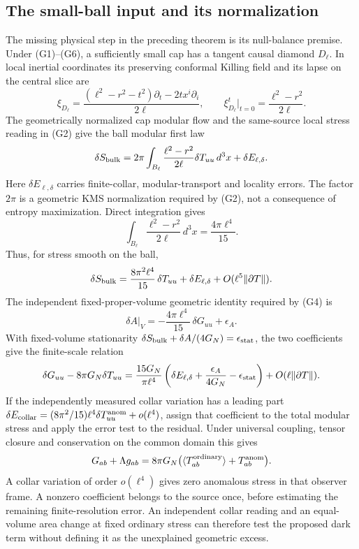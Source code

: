 \documentclass[11pt]{article}
\begin{document}
\subsection{The small-ball input and its normalization}
The missing physical step in the preceding theorem is its null-balance
premise. Under (G1)--(G6), a sufficiently small cap has a tangent causal
diamond $D_\ell$. In local inertial coordinates its preserving conformal
Killing field and its lapse on the central slice are
\[
 \xi_{D_\ell}=\frac{(\ell^2-r^2-t^2)\partial_t-2t x^i\partial_i}{2\ell},
 \qquad \xi^t_{D_\ell}\big|_{t=0}
 =\frac{\ell^2-r^2}{2\ell}.
\]
The geometrically normalized cap modular flow and the same-source local
stress reading in (G2) give the ball modular first law
\[
 \delta S_{\rm bulk}
 =2\pi\int_{B_\ell}\frac{\ell^2-r^2}{2\ell}
       \delta T_{uu}\,d^3x+\delta E_{\ell,\delta}.
\]
Here $\delta E_{\ell,\delta}$ carries finite-collar, modular-transport and
locality errors. The factor $2\pi$ is a geometric KMS normalization required
by (G2), not a consequence of entropy maximization. Direct integration gives
\[
 \int_{B_\ell}\frac{\ell^2-r^2}{2\ell}\,d^3x
 =\frac{4\pi\ell^4}{15}.
\]
Thus, for stress smooth on the ball,
\[
 \delta S_{\rm bulk}
 =\frac{8\pi^2\ell^4}{15}\,\delta T_{uu}
  +\delta E_{\ell,\delta}+O(\ell^5\|\partial T\|).
\]
The independent fixed-proper-volume geometric identity required by (G4) is
\[
 \delta A\big|_V
 =-\frac{4\pi\ell^4}{15}\,\delta G_{uu}+\epsilon_A.
\]
With fixed-volume stationarity
$\delta S_{\rm bulk}+\delta A/(4G_N)=\epsilon_{\rm stat}$,
the two coefficients give the finite-scale relation
\[
 \delta G_{uu}-8\pi G_N\delta T_{uu}
 =\frac{15G_N}{\pi\ell^4}
   \left(\delta E_{\ell,\delta}
       +\frac{\epsilon_A}{4G_N}-\epsilon_{\rm stat}\right)
   +O(\ell\|\partial T\|).
\]
If the independently measured collar variation has a leading part
$\delta E_{\rm collar}=(8\pi^2/15)\ell^4\delta T^{\rm anom}_{uu}
+o(\ell^4)$, assign that coefficient to the total modular stress and
apply the error test to the residual. Under universal coupling, tensor
closure and conservation on the common domain this gives
\[
 G_{ab}+\Lambda g_{ab}=8\pi G_N
    \bigl(\langle T^{\rm ordinary}_{ab}\rangle+T^{\rm anom}_{ab}\bigr).
\]
A collar variation of order $o(\ell^4)$ gives zero anomalous stress
in that observer frame. A nonzero coefficient belongs to the source
once, before estimating the remaining finite-resolution error. An
independent collar reading and an equal-volume area change at fixed
ordinary stress can therefore test the proposed dark term without
defining it as the unexplained geometric excess.
\end{document}
